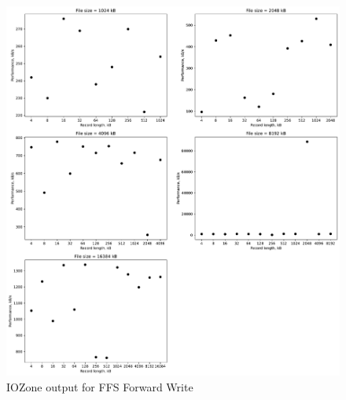 \begin{figure}[!htb]
	\label{fig:app_bench_ffs_write}
	\begin{center}
		\includegraphics[width=1.0\textwidth]{figures/benchmarking/ffs/Write.pdf}
	\end{center}
	\caption{IOZone output for \gls{FFS} Forward Write}
\end{figure}


